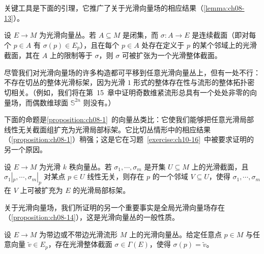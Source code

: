\documentclass[../../main.tex]{subfiles}
\begin{document}
关键工具是下面的引理，它推广了关于光滑向量场的相应结果（\cref{lemma:ch08-13}）。

\begin{lemma}[截面扩张引理]\label{lemma:ch10-截面扩张引理}
设 $E\to M$ 为光滑向量丛。若 $A\subseteq M$ 是闭集，而 $\sigma\colon A\to E$ 是连续截面（即对每个 $p\in A$ 有 $\sigma(p)\in E_p$），且在每个 $p\in A$ 处存在定义于 $p$ 的某个邻域上的光滑截面，其在 $A$ 上的限制等于 $\sigma$，则 $\sigma$ 可被扩张为一个光滑整体截面。
\end{lemma}

尽管我们对光滑向量场的许多构造都可平移到任意光滑向量丛上，但有一处不行：不存在切丛的整体光滑标架，因为光滑 $1$ 形式的整体存在性与流形的整体拓扑密切相关。（例如，我们将在第~15~章中证明奇数维紧流形总具有一个处处非零的向量场，而偶数维球面 $\mathbb{S}^{2n}$ 则没有。）

下面的命题是\cref{proposition:ch08-1}~的向量丛类比：它使我们能够把任意光滑局部线性无关截面组扩充为光滑局部标架。它比切丛情形中的相应结果（\cref{proposition:ch08-1}）稍强；这是它在习题~\ref{exercise:ch10-16}~中被要求证明的另一个原因。

\begin{proposition}[扩充为局部标架]\label{proposition:ch10-扩充为局部标架}
设 $E\to M$ 为光滑 $k$ 秩向量丛。若 $\sigma_1,\cdots ,\sigma_m$ 是开集 $U\subseteq M$ 上的光滑截面，且 $\sigma_1|_p,\cdots ,\sigma_m|_p$ 对某点 $p\in U$ 线性无关，则存在 $p$ 的一个邻域 $V\subseteq U$，使得 $\sigma_1,\cdots ,\sigma_m$ 在 $V$ 上可被扩充为 $E$ 的光滑局部标架。
\end{proposition}

关于光滑向量场，我们所证明的另一个重要事实是全局光滑向量场存在（\cref{proposition:ch08-14}），这是光滑向量丛的一般性质。

\begin{proposition}[整体光滑截面]\label{proposition:ch10-整体光滑截面}
设 $E\to M$ 为带边或不带边光滑流形 $M$ 上的光滑向量丛。给定任意点 $p\in M$ 与任意向量 $\tilde v\in E_p$，存在光滑整体截面 $\sigma\in\Gamma(E)$，使得 $\sigma(p)=\tilde v$。
\end{proposition}
\end{document}
